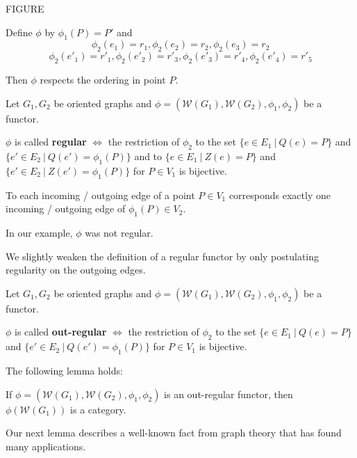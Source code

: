 FIGURE

Define $\phi$ by $\phi_1(P) = P'$ and 
\[ \phi_2(e_1) = r_1, \phi_2(e_2) = r_2, \phi_2(e_3) = r_2 \]
\[ \phi_2(e'_1) = r'_1, \phi_2(e'_2) = r'_3, \phi_2(e'_3) = r'_4, \phi_2(e'_4) = r'_5 \]

Then $\phi$ respects the ordering in point $P$.

\begin{definition}
Let $G_1, G_2$ be oriented graphs and $\phi = (\mathcal{W}(G_1), \mathcal{W}(G_2),
\phi_1, \phi_2)$ be a functor.

$\phi$ is called {\bf regular} $\Leftrightarrow$ the restriction of $\phi_2$
to the set $\{ e \in E_1\ |\ Q(e) = P \}$ and $\{ e' \in E_2\ |\ Q(e') = \phi_1(P) \}$ and to $\{
e \in E_1\ |\ Z(e) = P \}$ and $\{ e' \in E_2\ |\ Z(e') = \phi_1(P) \}$ for $P
\in V_1$ is bijective.
\end{definition}

To each incoming / outgoing edge of a point $P \in V_1$ corresponds exactly
one incoming / outgoing edge of $\phi_1(P) \in V_2$.

In our example, $\phi$ was not regular.

We slightly weaken the definition of a regular functor by only postulating
regularity on the outgoing edges.

\begin{definition}
Let $G_1, G_2$ be oriented graphs and $\phi = (\mathcal{W}(G_1), \mathcal{W}(G_2),
\phi_1, \phi_2)$ be a functor.

$\phi$ is called {\bf out-regular} $\Leftrightarrow$ the restriction of $\phi_2$
to the set $\{ e \in E_1\ |\ Q(e) = P \}$ and $\{ e' \in E_2\ |\ Q(e') = \phi_1(P) \}$ for
$P \in V_1$ is bijective.
\end{definition}

The following lemma holds:

\begin{lemma}
If $\phi = (\mathcal{W}(G_1), \mathcal{W}(G_2), \phi_1, \phi_2)$ is an
out-regular functor, then \\ $\phi(\mathcal{W}(G_1))$ is a category.
\end{lemma}

Our next lemma describes a well-known fact from graph theory that has found many
applications.

